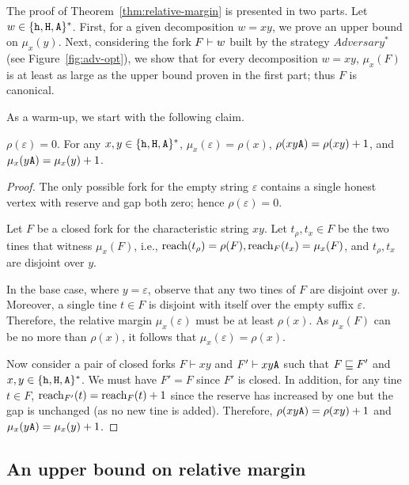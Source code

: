 

The proof of Theorem~\ref{thm:relative-margin} is presented in two parts. 
Let $w \in \{\mathtt{h}, \mathtt{H}, \mathtt{A}\}^*$.
First, for a given decomposition $w = xy$, 
we prove an upper bound on $\mu_x(y)$. 
Next, 
considering the fork $F \vdash w$ built by the strategy $Adversary^*$ 
(see Figure~\ref{fig:adv-opt}), 
we show that 
for every decomposition $w = xy$, 
$\mu_x(F)$ is at least as large as the upper bound proven in the first part; 
thus $F$ is canonical. 

As a warm-up, we start with the following claim.

\begin{claim}\label{claim:rho-mu-A}
  $\rho(\varepsilon) = 0$. 
  For any $x, y \in \{\mathtt{h}, \mathtt{H}, \mathtt{A}\}^*$, 
  $\mu_x(\varepsilon) = \rho(x)$, 
  $\rho(xy\mathtt{A}) = \rho(xy) + 1$, 
  and $\mu_x(y\mathtt{A}) = \mu_x(y) + 1$.
\end{claim}
\begin{proof}
  The only possible fork for the empty string $\varepsilon$ 
  contains a single honest vertex 
  with reserve and gap both zero; 
  hence $\rho(\varepsilon) = 0$.

  Let $F$ be a closed fork for the characteristic string $xy$. 
  Let $t_\rho, t_x \in F$ be the two tines that witness $\mu_x(F)$, 
  i.e., $\operatorname{reach}(t_\rho) = \rho(F), \operatorname{reach}_F(t_x) = \mu_x(F)$, 
  and $t_\rho, t_x$ are disjoint over $y$. 


  In the base case, where $y=\varepsilon$, 
  observe that any two tines of $F$ 
  are disjoint over $y$. 
  Moreover, a single tine $t \in F$ 
  is disjoint with itself over the empty suffix $\varepsilon$. 
  Therefore, the relative margin $\mu_x(\varepsilon)$ must be at least $\rho(x)$. 
  As $\mu_x(F)$ can be no more than $\rho(x)$, it follows that 
  $\mu_x(\varepsilon) = \rho(x)$.


  Now consider a pair of closed forks $F\vdash xy$ and $F'\vdash xy\mathtt{A}$ 
  such that $F \sqsubseteq F'$ and $x,y\in\{\mathtt{h}, \mathtt{H}, \mathtt{A}\}^*$. 
  We must have $F' = F$ since $F'$ is closed. 
  In addition, for any tine $t \in F$, 
  $\operatorname{reach}_{F'}(t) = \operatorname{reach}_F(t) + 1$ 
  since the reserve has increased by one 
  but the gap is unchanged 
  (as no new tine is added). Therefore, 
  $\rho(xy\mathtt{A}) = \rho(xy) + 1$ and 
  $\mu_x(y\mathtt{A}) = \mu_x(y)+1$.
\end{proof}


\subsection{An upper bound on relative margin}


